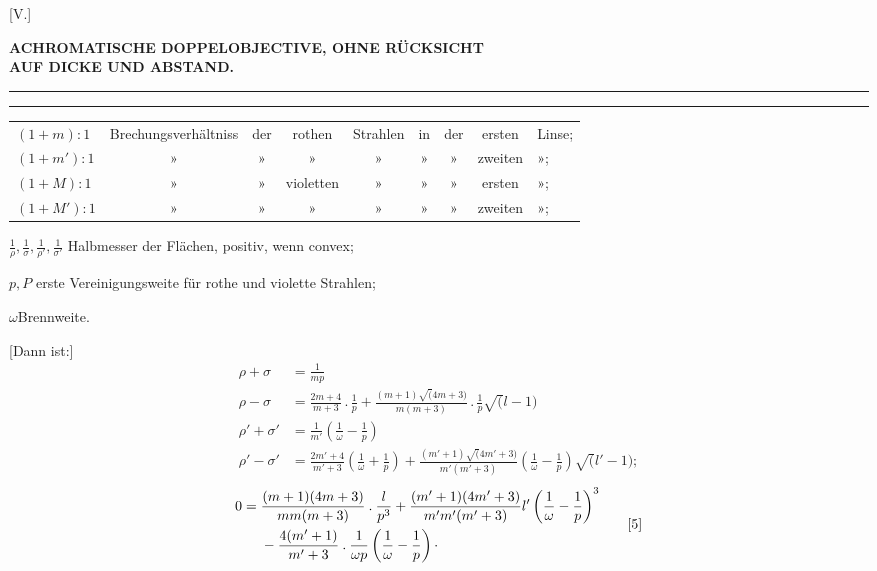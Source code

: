 \clearpage\begingroup
{}\NoSourceHead
\makeatletter\tagsleft@true\let\veqno\@@leqno\makeatother
\newcommand{\Vroot}{\mathord{\vcenter{\hbox{\Large$\surd$}}}}
\newcommand{\Vpoint}{\mathpunct{\vcenter{\hbox{.}}}}
\begin{center}
[V.]\par\bigskip
\textbf{ACHROMATISCHE DOPPELOBJECTIVE, OHNE RÜCKSICHT\\
AUF DICKE UND ABSTAND.}\par\medskip
\rule{.44\linewidth}{.4pt}\par
[Aus Handbuch 21, Bg, S. 29, 30.]\par
\rule{.44\linewidth}{.4pt}
\end{center}
\begin{center}
\begingroup\fontsize{9}{12}\selectfont\setlength{\tabcolsep}{2pt}
\begin{tabular}{lcccccccl}
$(1+m):1$&Brechungsverhältniss&der&rothen&Strahlen&in&der&ersten&Linse;\\
$(1+m'):1$&»&»&»&»&»&»&zweiten&»\quad;\\
$(1+M):1$&»&»&violetten&»&»&»&ersten&»\quad;\\
$(1+M'):1$&»&»&»&»&»&»&zweiten&»\quad;
\end{tabular}\endgroup
\end{center}
\noindent $\frac1\rho,\frac1\sigma,\frac1{\rho'},\frac1{\sigma'}$ Halbmesser der Flächen, positiv, wenn convex;\par
\noindent $p,P$ erste Vereinigungsweite für rothe und violette Strahlen;\par
\noindent\hspace*{.5em}$\omega$\quad Brennweite.

[Dann ist:]
\begin{align}
\rho+\sigma&=\frac1{mp}\tag*{[1]}\\[4pt]
\rho-\sigma&=\frac{2m+4}{m+3}\mathbin{.}\frac1p+\frac{(m+1)\surd(4m+3)}{m(m+3)}\mathbin{.}\frac1p\surd(l-1)\tag*{[2]}\\[4pt]
\rho'+\sigma'&=\frac1{m'}\left(\frac1\omega-\frac1p\right)\tag*{[3]}\\[4pt]
\rho'-\sigma'&=\frac{2m'+4}{m'+3}\left(\frac1\omega+\frac1p\right)+\frac{(m'+1)\surd(4m'+3)}{m'(m'+3)}\left(\frac1\omega-\frac1p\right)\surd(l'-1);\tag*{[4]}
\end{align}
\begin{equation}
\begin{aligned}
0={}&\frac{(m+1)(4m+3)}{mm(m+3)}\mathbin{.}\frac l{p^3}
+\frac{(m'+1)(4m'+3)}{m'm'(m'+3)}l'\left(\frac1\omega-\frac1p\right)^3\\
&-\frac{4(m'+1)}{m'+3}\mathbin{.}\frac1{\omega p}\left(\frac1\omega-\frac1p\right)\Vpoint
\end{aligned}\tag*{[5]}
\end{equation}

